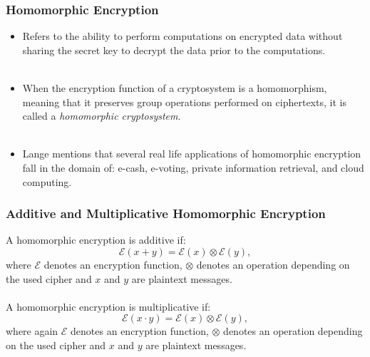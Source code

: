 \documentclass{beamer}
\begin{document}
\begin{frame}
\frametitle{Homomorphic Encryption}
\begin{itemize}
\item Refers to the ability to perform computations on encrypted data without sharing the secret key to decrypt the data prior to the computations. \\~\\
\item When the encryption function of a cryptosystem is a homomorphism, meaning that it preserves group operations performed on ciphertexts, it is called a \emph{homomorphic cryptosystem}. \\~\\
\item Lange \cite{lange2011} mentions that several real life applications of homomorphic encryption fall in the domain of: e-cash, e-voting, private information retrieval, and cloud computing.
\end{itemize}
\end{frame}

\begin{frame}
\frametitle{Additive and Multiplicative Homomorphic Encryption}

A homomorphic encryption is additive if:
\begin{equation}
\mathcal{E}(x+y) = \mathcal{E}(x)\otimes \mathcal{E}(y),
\end{equation}
where $\mathcal{E}$ denotes an encryption function, $\otimes$ denotes an operation depending on the used cipher and $x$ and $y$ are plaintext messages. \\~\\

A homomorphic encryption is multiplicative if:
\begin{equation}
\mathcal{E}(x \cdot y) = \mathcal{E}(x) \otimes \mathcal{E}(y),
\end{equation}
where again $\mathcal{E}$ denotes an encryption function, $\otimes$ denotes an operation depending on the used cipher and $x$ and $y$ are plaintext messages.

\end{frame}
\end{document}
